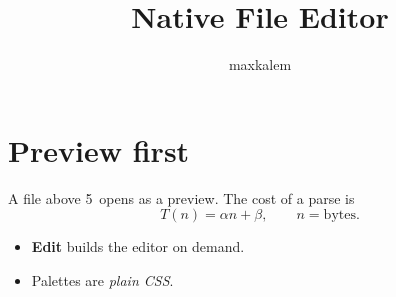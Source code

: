 \documentclass[11pt]{article}
\title{Native File Editor}
\author{maxkalem}
\newcommand{\limit}{5\,\mathrm{MB}}
\begin{document}
\maketitle

\section{Preview first}
A file above \limit{} opens as a preview. The cost of a parse is
\begin{equation}
  T(n) = \alpha n + \beta, \qquad n = \text{bytes}.
\end{equation}

\begin{itemize}
  \item \textbf{Edit} builds the editor on demand.
  \item Palettes are \emph{plain CSS}.
\end{itemize}
\end{document}
